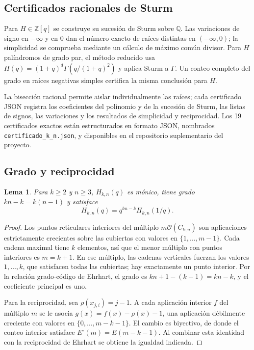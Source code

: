\documentclass[11pt,a4paper]{article}
\newtheorem{lemma}[theorem]{Lema}
\theoremstyle{definition}
\begin{document}
\subsection{Certificados racionales de Sturm}

Para $H\in\mathbb Z[q]$ se construye su sucesión de Sturm sobre
$\mathbb Q$. Las variaciones de signo en $-\infty$ y en $0$ dan el
número exacto de raíces distintas en $(-\infty,0)$; la simplicidad se
comprueba mediante un cálculo de máximo común divisor. Para $H$
palíndromos de grado par, el método reducido usa
$H(q)=(1+q)^d\Gamma(q/(1+q)^2)$ y aplica Sturm a $\Gamma$. Un conteo
completo del grado en raíces negativas simples certifica la misma
conclusión para $H$.

La bisección racional permite aislar individualmente las raíces; cada
certificado JSON registra los coeficientes del polinomio y de la sucesión
de Sturm, las listas de signos, las variaciones y los resultados de
simplicidad y reciprocidad. Los 19 certificados exactos están
estructurados en formato JSON, nombrados
\texttt{certificado\_k\_n.json}, y disponibles en el repositorio
suplementario del proyecto.

\subsection{Grado y reciprocidad}\label{sec:estructura}

\begin{lemma}\label{lem:estructura}
Para $k\ge2$ y $n\ge3$, $H_{k,n}(q)$ es mónico, tiene grado $kn-k=k(n-1)$ y satisface
\[
H_{k,n}(q)=q^{kn-k}H_{k,n}(1/q).
\]
\end{lemma}

\begin{proof}
Los puntos reticulares interiores del múltiplo $m\mathcal O(C_{k,n})$ son aplicaciones estrictamente crecientes sobre las cubiertas con valores en $\{1,\ldots,m-1\}$. Cada cadena maximal tiene $k$ elementos, así que el menor múltiplo con puntos interiores es $m=k+1$. En ese múltiplo, las cadenas verticales fuerzan los valores $1,\ldots,k$, que satisfacen todas las cubiertas; hay exactamente un punto interior. Por la relación grado-código de Ehrhart, el grado es $kn+1-(k+1)=kn-k$, y el coeficiente principal es uno.

Para la reciprocidad, sea $\rho(x_{j,i})=j-1$. A cada aplicación interior $f$ del múltiplo $m$ se le asocia $g(x)=f(x)-\rho(x)-1$, una aplicación débilmente creciente con valores en $\{0,\ldots,m-k-1\}$. El cambio es biyectivo, de donde el conteo interior satisface $E^\circ(m)=E(m-k-1)$. Al combinar esta identidad con la reciprocidad de Ehrhart se obtiene la igualdad indicada.
\end{proof}
\end{document}
